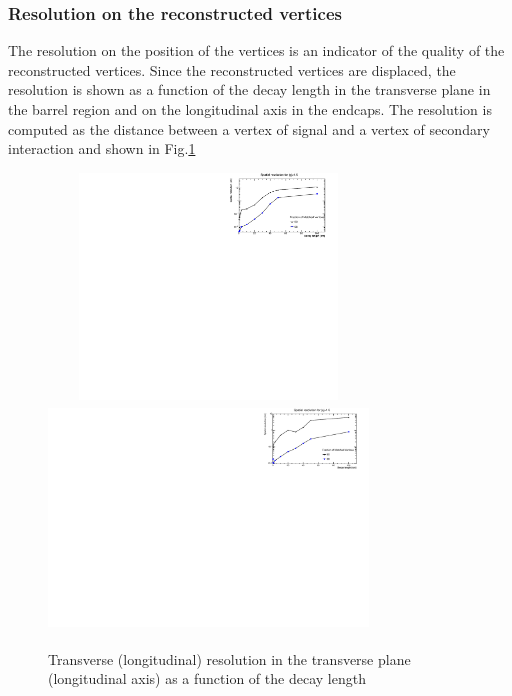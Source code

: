 \documentclass{cernatlasnote}
\begin{document}
\FloatBarrier
        \subsubsection{Resolution on the reconstructed vertices}
        The resolution on the position of the vertices is an indicator of the quality of the reconstructed vertices. Since the reconstructed vertices are displaced, the resolution is shown as a function of the decay length in the transverse plane in the barrel region and on the longitudinal axis in the endcaps. The resolution is computed as the distance between a vertex of signal and a vertex of secondary interaction  
        and shown in Fig.\ref{fig:VTXRes}   
        \begin{figure}[ht]
        \hspace{-1cm}
\includegraphics[height=6cm, width=8.5cm, trim= 0cm 7cm 0cm 0cm,clip]{images/VTXRes/ResTrans.pdf}\includegraphics[height=6cm, width=8.5cm, trim= 0cm 0cm 0cm 0cm,clip]{images/VTXRes/ResLong.pdf}
\caption{\label{fig:VTXRes} Transverse (longitudinal) resolution  in the transverse plane (longitudinal axis) as a function of the decay length }
\end{figure}   

\end{document}
